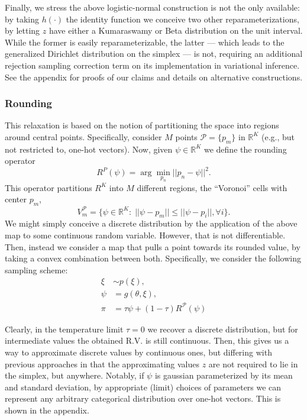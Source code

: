 \documentclass{article}
\begin{document}
Finally, we stress the above logistic-normal construction is not the only available: by taking $h(\cdot) $ the identity function we conceive two other reparameterizations, by letting $z$ have either a Kumaraswamy or Beta distribution on the unit interval. While the former is easily reparameterizable, the latter --- which leads to the generalized Dirichlet distribution on the simplex ---  is not, requiring an additional rejection sampling correction term on its implementation in variational inference.
See the appendix for proofs of our claims and details on alternative constructions.


\subsubsection{Rounding}
This relaxation is based on the notion of partitioning the space into regions around central points. Specifically,  consider $M$ points $\mathcal{P}=\{p_m\}$ in $\mathbb{R}^K$ (e.g., but not restricted to, one-hot vectors). Now, given $\psi\in\mathbb{R}^K$ we define the rounding operator $$R^{P}(\psi)=\arg\min_{p_n} ||p_n-\psi||^2.$$
This operator partitions $R^K$ into $M$ different regions, the ``Voronoi'' cells with center $p_m$, 
\begin{equation}V^\mathcal{P}_{m}=\{\psi\in\mathbb{R}^K:\;||\psi-p_m||\leq ||\psi-p_i||,\forall i\}.\end{equation}
We might simply conceive a discrete distribution by the application of the above map to some continuous random variable. However, that is not differentiable. Then, instead we consider a map that pulls a point towards its rounded value, by taking a convex combination between both. Specifically, we consider the following sampling scheme:
\begin{align}
 \xi   &\sim p(\xi), \\
  \psi &= g(\theta, \xi), \\
  \pi &   =  \tau \psi + (1-\tau) R^\mathcal{P}(\psi) 
\end{align}

Clearly, in the temperature limit $\tau=0$ we recover a discrete distribution, but for intermediate values the obtained R.V. is still continuous. Then, this gives us a way to approximate discrete values by continuous ones, but differing with previous approaches in that the approximating values $z$ are not required to lie in the simplex, but anywhere. Notably, if $\psi$ is gaussian parameterized by its mean and standard deviation, by appropriate (limit) choices of parameters we can represent any arbitrary categorical distribution over one-hot vectors. This is shown in the appendix. 
 
\end{document}
